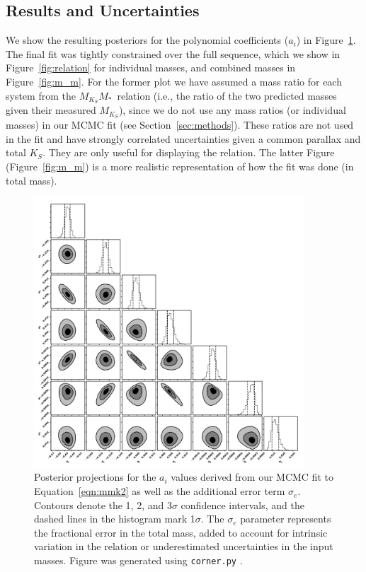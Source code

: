 \documentclass[twocolumn]{aastex62}
\newcommand{\mks}{$M_{K_S}$}
\newcommand{\mmk}{$M_{K_S}$\textendash$M_*$}
\begin{document}
\subsection{Results and Uncertainties}\label{sec:res}

We show the resulting posteriors for the polynomial coefficients ($a_i$) in Figure~\ref{fig:fitpost}. The final fit was tightly constrained over the full sequence, which we show in Figure~\ref{fig:relation} for individual masses, and combined masses in Figure~\ref{fig:m_m}. For the former plot we have assumed a mass ratio for each system from the \mmk\ relation (i.e., the ratio of the two predicted masses given their measured \mks), since we do not use any mass ratios (or individual masses) in our MCMC fit (see Section~\ref{sec:methods}). These ratios are not used in the fit and have strongly correlated uncertainties given a common parallax and total $K_S$. They are only useful for displaying the relation. The latter Figure (Figure~\ref{fig:m_m}) is a more realistic representation of how the fit was done (in total mass).

\begin{figure}[p]
\begin{center}
\includegraphics[width=0.9\textwidth]{output_7_eMass.pdf}
\caption{Posterior projections for the $a_i$ values derived from our MCMC fit to Equation~\ref{eqn:mmk2} as well as the additional error term $\sigma_e$. Contours denote the 1, 2, and 3$\sigma$ confidence intervals, and the dashed lines in the histogram mark 1$\sigma$. The $\sigma_e$ parameter represents the fractional error in the total mass, added to account for intrinsic variation in the relation or underestimated uncertainties in the input masses. Figure was generated using {\tt corner.py} \citep{corner}.}
\label{fig:fitpost}
\end{center}
\end{figure}
\end{document}
